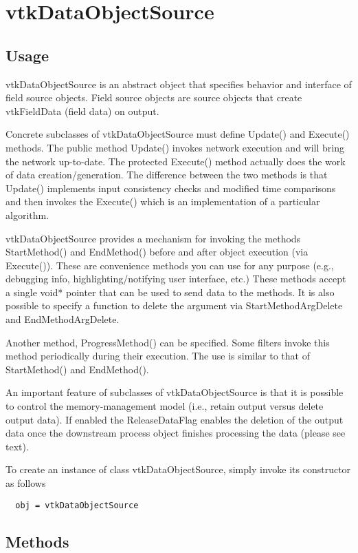 \section{vtkDataObjectSource}

\subsection{Usage}

 vtkDataObjectSource is an abstract object that specifies behavior and
 interface of field source objects. Field source objects are source objects
 that create vtkFieldData (field data) on output.

 Concrete subclasses of vtkDataObjectSource must define Update() and
 Execute() methods. The public method Update() invokes network execution
 and will bring the network up-to-date. The protected Execute() method
 actually does the work of data creation/generation. The difference between
 the two methods is that Update() implements input consistency checks and
 modified time comparisons and then invokes the Execute() which is an
 implementation of a particular algorithm.

 vtkDataObjectSource provides a mechanism for invoking the methods
 StartMethod() and EndMethod() before and after object execution (via
 Execute()). These are convenience methods you can use for any purpose
 (e.g., debugging info, highlighting/notifying user interface, etc.) These
 methods accept a single void* pointer that can be used to send data to the
 methods. It is also possible to specify a function to delete the argument
 via StartMethodArgDelete and EndMethodArgDelete.

 Another method, ProgressMethod() can be specified. Some filters invoke this 
 method periodically during their execution. The use is similar to that of 
 StartMethod() and EndMethod().

 An important feature of subclasses of vtkDataObjectSource is that it is
 possible to control the memory-management model (i.e., retain output
 versus delete output data). If enabled the ReleaseDataFlag enables the
 deletion of the output data once the downstream process object finishes
 processing the data (please see text).

To create an instance of class vtkDataObjectSource, simply
invoke its constructor as follows
\begin{verbatim}
  obj = vtkDataObjectSource
\end{verbatim}
\subsection{Methods}

